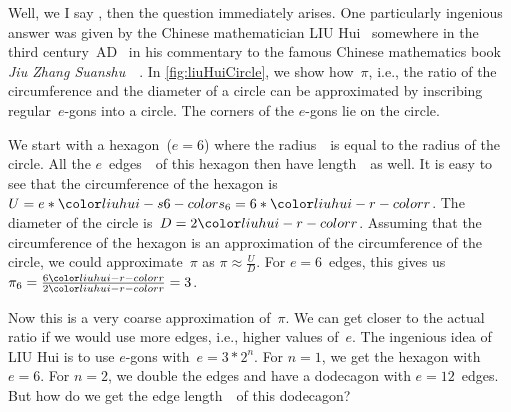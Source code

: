 Well, we I say , then the question  immediately arises.
One particularly ingenious answer was given by the Chinese mathematician LIU Hui~ somewhere in the third century~AD~\cite{CR2003LH} in his commentary to the famous Chinese mathematics book \emph{Jiu Zhang Suanshu}~~\cite{CR2003LH,SCL1999TNCOTMACAC,S1998LHATFGAOCM,D2010AALHOCAS,C2002LFLHADWTDM}.
In \cref{fig:liuHuiCircle}, we show how~$\pi$, i.e., the ratio of the circumference and the diameter of a circle can be approximated by inscribing regular~$e$\nobreakdash-gons into a circle.
The corners of the $e$\nobreakdash-gons lie on the circle.

We start with a hexagon~($e=6$) where the radius~\liuhuir\ is equal to the radius of the circle.
All the $e$~edges~\liuhuiss\ of this hexagon then have length~\liuhuir\ as well.
It is easy to see that the circumference of the hexagon is~$U=e*\liuhuiss=6*\liuhuir$.
The diameter of the circle is~$D=2\liuhuir$.
Assuming that the circumference of the hexagon is an approximation of the circumference of the circle, we could approximate~$\pi$ as $\pi\approx\frac{U}{D}$.
For $e=6$~edges, this gives us $\pi_6=\frac{6\liuhuir}{2\liuhuir}=3$.

Now this is a very coarse approximation of~$\pi$.
We can get closer to the actual ratio if we would use more edges, i.e., higher values of~$e$.
The ingenious idea of LIU Hui is to use $e$\nobreakdash-gons with~$e=3*2^n$.
For $n=1$, we get the hexagon with $e=6$.
For $n=2$, we double the edges and have a dodecagon with $e=12$~edges.
But how do we get the edge length~\liuhuist\ of this dodecagon?


